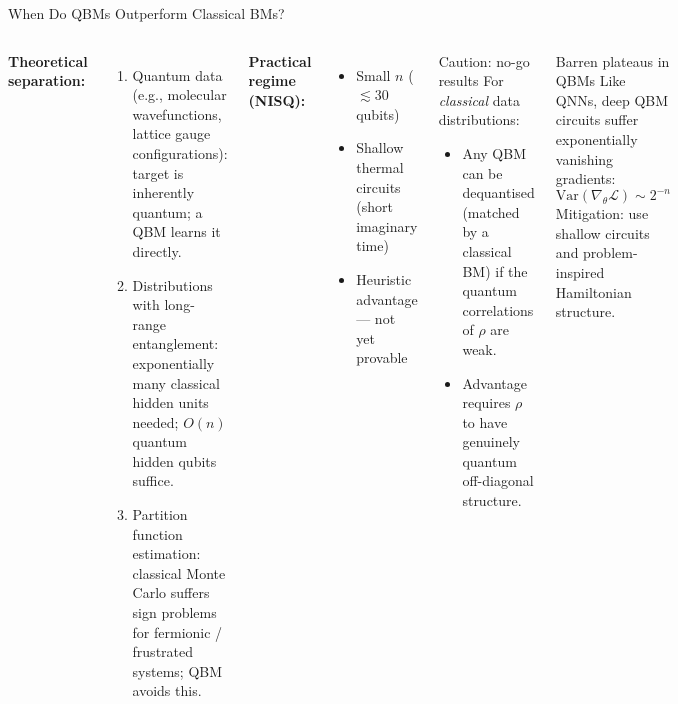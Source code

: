 \documentclass[aspectratio=169,10pt]{beamer}
\begin{document}
\begin{frame}{When Do QBMs Outperform Classical BMs?}
  \begin{columns}[T]
      \textbf{Theoretical separation:}
      \begin{enumerate}
        \item Quantum data (e.g., molecular wavefunctions,
              lattice gauge configurations): target is
              inherently quantum; a QBM learns it directly.
        \item Distributions with long-range entanglement:
              exponentially many classical hidden units
              needed; $O(n)$ quantum hidden qubits suffice.
        \item Partition function estimation: classical
              Monte Carlo suffers sign problems for
              fermionic / frustrated systems; QBM avoids this.
      \end{enumerate}

      \textbf{Practical regime (NISQ):}
      \begin{itemize}
        \item Small $n$ ($\lesssim 30$ qubits)
        \item Shallow thermal circuits (short imaginary time)
        \item Heuristic advantage — not yet provable
      \end{itemize}
      \begin{alertblock}{Caution: no-go results}
        For \emph{classical} data distributions:
        \begin{itemize}
          \item Any QBM can be dequantised
                (matched by a classical BM) if the
                quantum correlations of $\rho$ are weak.
          \item Advantage requires $\rho$ to have
                genuinely quantum off-diagonal structure.
        \end{itemize}
      \end{alertblock}
      \vspace{0.2cm}
      \begin{block}{Barren plateaus in QBMs}
        Like QNNs, deep QBM circuits suffer exponentially
        vanishing gradients:
        \[
          \mathrm{Var}\!\left(\nabla_\theta\mathcal{L}\right)
          \sim 2^{-n}
        \]
        Mitigation: use shallow circuits and problem-inspired
        Hamiltonian structure.
      \end{block}
  \end{columns}
\end{frame}
\end{document}
